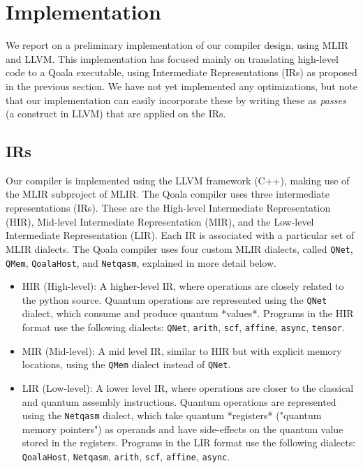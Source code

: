 \section{Implementation}

We report on a preliminary implementation of our compiler design, using MLIR and LLVM.
This implementation has focused mainly on translating high-level code to a Qoala executable, using Intermediate Representations (IRs) as proposed in the previous section.
We have not yet implemented any optimizations, but note that our implementation can easily incorporate these by writing these as \emph{passes} (a construct in LLVM) that are applied on the IRs.

\subsection{IRs}
Our compiler is implemented using the LLVM framework (C++), making use of the MLIR subproject of MLIR.
The Qoala compiler uses three intermediate representations (IRs).
These are the High-level Intermediate Representation (HIR), Mid-level Intermediate Representation (MIR), and the Low-level Intermediate Representation (LIR).
Each IR is associated with a particular set of MLIR dialects.
The Qoala compiler uses four custom MLIR dialects, called \texttt{QNet}, \texttt{QMem}, \texttt{QoalaHost}, and \texttt{Netqasm}, explained in more detail below.

\begin{itemize}
\item HIR (High-level): A higher-level IR, where operations are closely related
  to the python source.
  Quantum operations are represented using the \texttt{QNet} dialect, which consume and produce quantum *values*.
  Programs in the HIR format use the following dialects: \texttt{QNet}, \texttt{arith}, \texttt{scf}, \texttt{affine}, \texttt{async}, \texttt{tensor}.
\item MIR (Mid-level): A mid level IR, similar to HIR but with explicit memory locations, using the \texttt{QMem} dialect instead of \texttt{QNet}.
\item LIR (Low-level): A lower level IR, where operations are closer to the
  classical and quantum assembly instructions.
  Quantum operations are represented using the \texttt{Netqasm} dialect, which take quantum *registers* ("quantum memory pointers") as operands
  and have side-effects on the quantum value stored in the registers.
  Programs in the LIR format use the following dialects: \texttt{QoalaHost}, \texttt{Netqasm}, \texttt{arith}, \texttt{scf}, \texttt{affine}, \texttt{async}.
\end{itemize}

